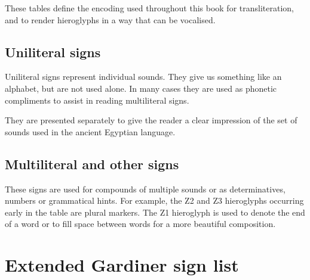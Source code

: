 These tables define the encoding used throughout this book for transliteration, and to render hieroglyphs in a way that can be vocalised.

\subsection*{Uniliteral signs}

Uniliteral signs represent individual sounds. They give us something like an alphabet, but are not used alone. In many cases they are used as phonetic compliments to assist in reading multiliteral signs.

They are presented separately to give the reader a clear impression of the set of sounds used in the ancient Egyptian language.



\subsection*{Multiliteral and other signs}

These signs are used for compounds of multiple sounds or as determinatives, numbers or grammatical hints. For example, the Z2 and Z3 hieroglyphs occurring early in the table are plural markers. The Z1 hieroglyph is used to denote the end of a word or to fill space between words for a more beautiful composition.



\section*{Extended Gardiner sign list}
